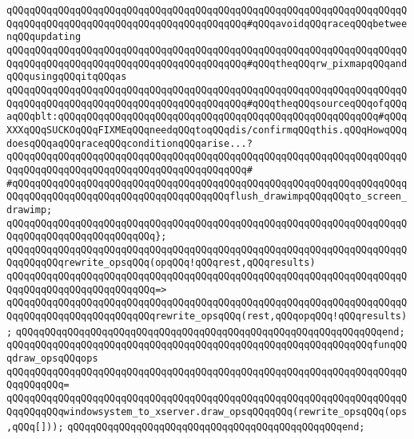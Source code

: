 \verb|qQQqqQQqqQQqqQQqqQQqqQQqqQQqqQQqqQQqqQQqqQQqqQQqqQQqqQQqqQQqqQQqqQQqqQQqqQQqqQQqqQQqqQQqqQQqqQQqqQQqqQQqqQQqqQQq#qQQqavoidqQQqraceqQQqbetweenqQQqupdating|\newline
\verb|qQQqqQQqqQQqqQQqqQQqqQQqqQQqqQQqqQQqqQQqqQQqqQQqqQQqqQQqqQQqqQQqqQQqqQQqqQQqqQQqqQQqqQQqqQQqqQQqqQQqqQQqqQQqqQQq#qQQqtheqQQqrw_pixmapqQQqandqQQqusingqQQqitqQQqas|\newline
\verb|qQQqqQQqqQQqqQQqqQQqqQQqqQQqqQQqqQQqqQQqqQQqqQQqqQQqqQQqqQQqqQQqqQQqqQQqqQQqqQQqqQQqqQQqqQQqqQQqqQQqqQQqqQQqqQQq#qQQqtheqQQqsourceqQQqofqQQqaqQQqblt:qQQqqQQqqQQqqQQqqQQqqQQqqQQqqQQqqQQqqQQqqQQqqQQqqQQqqQQq#qQQqXXXqQQqSUCKOqQQqFIXMEqQQqneedqQQqtoqQQqdis/confirmqQQqthis.qQQqHowqQQqdoesqQQqaqQQqraceqQQqconditionqQQqarise...?|\newline
\verb|qQQqqQQqqQQqqQQqqQQqqQQqqQQqqQQqqQQqqQQqqQQqqQQqqQQqqQQqqQQqqQQqqQQqqQQqqQQqqQQqqQQqqQQqqQQqqQQqqQQqqQQqqQQqqQQq#|\newline
\verb|#qQQqqQQqqQQqqQQqqQQqqQQqqQQqqQQqqQQqqQQqqQQqqQQqqQQqqQQqqQQqqQQqqQQqqQQqqQQqqQQqqQQqqQQqqQQqqQQqqQQqqQQqqQQqflush_drawimpqQQqqQQqto_screen_drawimp;|\newline
\verb|qQQqqQQqqQQqqQQqqQQqqQQqqQQqqQQqqQQqqQQqqQQqqQQqqQQqqQQqqQQqqQQqqQQqqQQqqQQqqQQqqQQqqQQqqQQqqQQq};|\newline
\newline
\verb|qQQqqQQqqQQqqQQqqQQqqQQqqQQqqQQqqQQqqQQqqQQqqQQqqQQqqQQqqQQqqQQqqQQqqQQqqQQqqQQqrewrite_opsqQQq(opqQQq!qQQqrest,qQQqresults)|\newline
\verb|qQQqqQQqqQQqqQQqqQQqqQQqqQQqqQQqqQQqqQQqqQQqqQQqqQQqqQQqqQQqqQQqqQQqqQQqqQQqqQQqqQQqqQQqqQQqqQQq=>|\newline
\verb|qQQqqQQqqQQqqQQqqQQqqQQqqQQqqQQqqQQqqQQqqQQqqQQqqQQqqQQqqQQqqQQqqQQqqQQqqQQqqQQqqQQqqQQqqQQqqQQqrewrite_opsqQQq(rest,qQQqopqQQq!qQQqresults);|\newline
\verb|qQQqqQQqqQQqqQQqqQQqqQQqqQQqqQQqqQQqqQQqqQQqqQQqqQQqqQQqqQQqqQQqend;|\newline
\newline
\verb|qQQqqQQqqQQqqQQqqQQqqQQqqQQqqQQqqQQqqQQqqQQqqQQqqQQqqQQqqQQqqQQqfunqQQqdraw_opsqQQqops|\newline
\verb|qQQqqQQqqQQqqQQqqQQqqQQqqQQqqQQqqQQqqQQqqQQqqQQqqQQqqQQqqQQqqQQqqQQqqQQqqQQqqQQq=|\newline
\verb|qQQqqQQqqQQqqQQqqQQqqQQqqQQqqQQqqQQqqQQqqQQqqQQqqQQqqQQqqQQqqQQqqQQqqQQqqQQqqQQqwindowsystem_to_xserver.draw_opsqQQqqQQq(rewrite_opsqQQq(ops,qQQq[]));|\newline
\verb|qQQqqQQqqQQqqQQqqQQqqQQqqQQqqQQqqQQqqQQqqQQqqQQqend;|\newline
